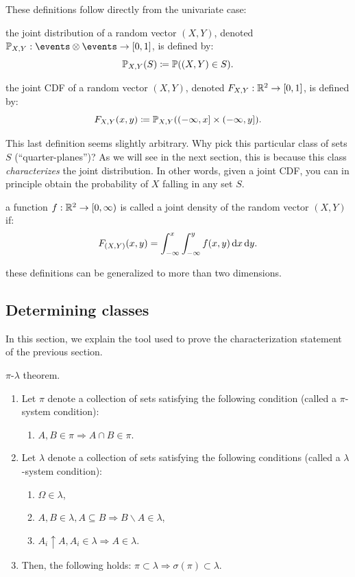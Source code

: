 \documentclass{article}
\begin{document}
These definitions follow directly from the univariate case:

 the joint distribution of a random vector $(X, Y)$, denoted $\P_{X,Y} : \events \otimes \events \to [0, 1]$, is defined by:
\[ {\mathbb P}_{X,Y}(S) \coloneqq {\mathbb P}((X, Y) \in S). \]

 the joint CDF of a random vector $(X, Y)$, denoted $F_{X,Y} : {\mathbb R}^2 \to [0, 1]$, is defined by:
\[ F_{X, Y}(x, y) \coloneqq {\mathbb P}_{X,Y}((-\infty, x] \times (-\infty, y]). \]

 This last definition seems slightly arbitrary. Why pick this particular class of sets $S$ (``quarter-planes'')? As we will see in the next section, this is because this class \emph{characterizes} the joint distribution. In other words, given a joint CDF, you can in principle obtain the probability of $X$ falling in any set $S$. 

 a function $f:{\mathbb R}^2 \to [0, \infty)$ is called a joint density of the random vector $(X,Y)$ if:
\[ F_{(X,Y)}(x,y) = \int_{-\infty}^x \int_{-\infty}^y f(x,y) \,\mathrm{d} x \,\mathrm{d} y. \]

 these definitions can be generalized to more than two dimensions.


\subsection{Determining classes}\label{sec:determining-classes}

In this section, we explain the tool used to prove the characterization statement of the previous section.

 $\pi$-$\lambda$ theorem. 
\begin{enumerate}
\item Let $\pi$ denote a collection of sets satisfying the following condition (called a $\pi$-system condition):
\begin{enumerate}
  \item $A, B \in \pi \Longrightarrow A\cap B\in \pi$.
\end{enumerate}
\item Let $\lambda$ denote a collection of sets satisfying the following conditions (called a $\lambda$-system condition):
\begin{enumerate}
  \item $\Omega \in \lambda$,
  \item $A, B \in \lambda, A \subseteq B \Longrightarrow B \backslash A \in \lambda$,
  \item $A_i \uparrow A, A_i \in \lambda \Longrightarrow A \in \lambda.$
\end{enumerate}
\item Then, the following holds: $\pi \subset \lambda \Longrightarrow \sigma(\pi) \subset \lambda$.
\end{enumerate}
\end{document}
